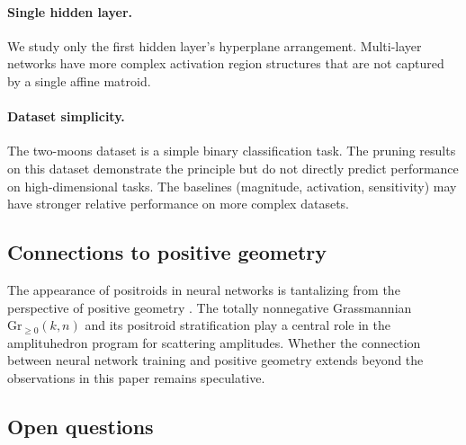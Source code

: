 \documentclass[11pt]{article}
\theoremstyle{definition}
\theoremstyle{remark}
\newcommand{\Gr}{\mathrm{Gr}}
\begin{document}
\paragraph{Single hidden layer.}
We study only the first hidden layer's hyperplane arrangement.
Multi-layer networks have more complex activation region structures
that are not captured by a single affine matroid.

\paragraph{Dataset simplicity.}
The two-moons dataset is a simple binary classification task.  The
pruning results on this dataset demonstrate the principle but do not
directly predict performance on high-dimensional tasks.  The
baselines (magnitude, activation, sensitivity) may have stronger
relative performance on more complex datasets.

\subsection{Connections to positive geometry}\label{sec:positive-geometry}

The appearance of positroids in neural networks is tantalizing from
the perspective of positive geometry \citep{arkani-hamed2017}.  The
totally nonnegative Grassmannian $\Gr_{\geq 0}(k,n)$ and its
positroid stratification play a central role in the amplituhedron
program for scattering amplitudes.  Whether the connection between
neural network training and positive geometry extends beyond the
observations in this paper remains speculative.

\subsection{Open questions}\label{sec:open}
\end{document}
